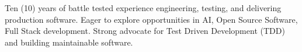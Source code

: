 \vspace{1pc}

\begin{center}
	\noindent Ten (10) years of battle tested experience engineering, testing, and delivering production software. Eager to explore opportunities in AI, Open Source Software, Full Stack development. Strong advocate for Test Driven Development (TDD) and building maintainable software.
	
\end{center}
\vspace{1pc}